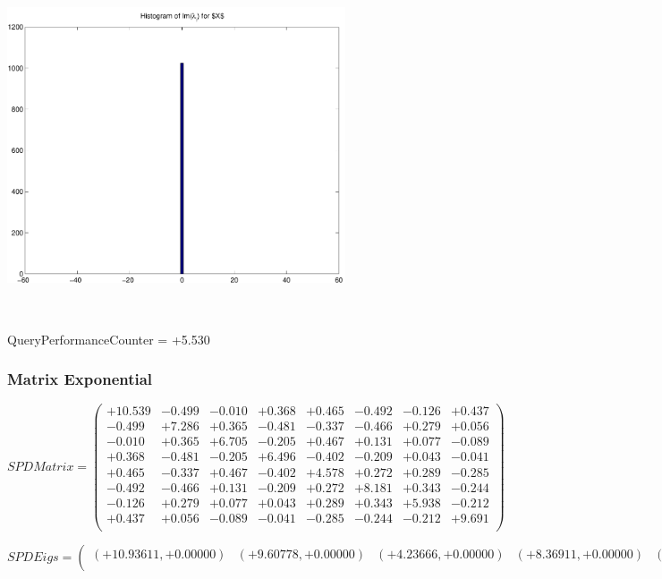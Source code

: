 \documentclass[9pt]{article}
\theoremstyle{plain}
\theoremstyle{definition}
\theoremstyle{remark}
\numberwithin{equation}{section}
\begin{document}
\includegraphics[width=10.0cm,height=10.0cm]{Im_lambda_n.pdf}

QueryPerformanceCounter  =  +5.530
\subsubsection{Matrix Exponential }
$SPD Matrix = \left(
\begin{array}{
cccccccc}
+10.539 & -0.499 & -0.010 & +0.368 & +0.465 & -0.492 & -0.126 & +0.437 \\
-0.499 & +7.286 & +0.365 & -0.481 & -0.337 & -0.466 & +0.279 & +0.056 \\
-0.010 & +0.365 & +6.705 & -0.205 & +0.467 & +0.131 & +0.077 & -0.089 \\
+0.368 & -0.481 & -0.205 & +6.496 & -0.402 & -0.209 & +0.043 & -0.041 \\
+0.465 & -0.337 & +0.467 & -0.402 & +4.578 & +0.272 & +0.289 & -0.285 \\
-0.492 & -0.466 & +0.131 & -0.209 & +0.272 & +8.181 & +0.343 & -0.244 \\
-0.126 & +0.279 & +0.077 & +0.043 & +0.289 & +0.343 & +5.938 & -0.212 \\
+0.437 & +0.056 & -0.089 & -0.041 & -0.285 & -0.244 & -0.212 & +9.691 \\
\end{array}
\right)$ \newline 

$SPD Eigs = \left(
\begin{array}{
cccccccc}
(+10.93611,+0.00000) & (+9.60778,+0.00000) & (+4.23666,+0.00000) & (+8.36911,+0.00000) & (+7.56229,+0.00000) & (+5.82791,+0.00000) & (+6.54198,+0.00000) & (+6.33139,+0.00000) \\
\end{array}
\right)$ \newline 
\end{document}
